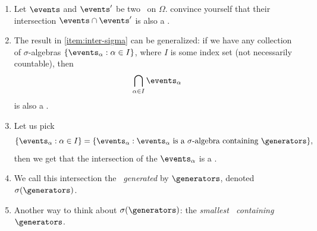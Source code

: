 \documentclass{article}
\begin{document}
\begin{enumerate}
  \item \label{item:inter-sigma} Let $\events$ and $\events'$ be two \sigmaalg\ on $\Omega$.  convince yourself that their intersection $\events \cap \events'$ is also a \sigmaalg.
  \item The result in \ref{item:inter-sigma} can be generalized: if we have any collection of $\sigma$-algebras $\{\events_\alpha : \alpha \in I\}$, where $I$ is some index set (not necessarily countable), then \[ \bigcap_{\alpha \in I} \events_\alpha \] is also a \sigmaalg.
  \item Let us pick \[\{\events_\alpha : \alpha \in I\} = \{\events_\alpha : \events_\alpha \text{ is a }\sigma\text{-algebra containing }\generators\},\] then we get that the intersection of the $\events_\alpha$ is a \sigmaalg.
  \item We call this intersection the \sigmaalg\ \emph{generated} by $\generators$, denoted $\sigma(\generators)$. 
  \item Another way to think about $\sigma(\generators)$: the \emph{smallest \sigmaalg\ containing $\generators$}.
\end{enumerate}
\end{document}
